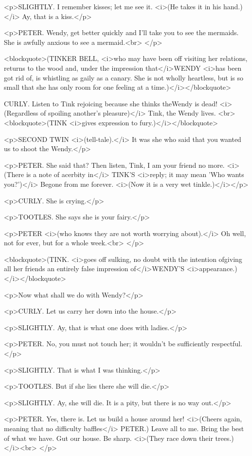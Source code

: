 <p>SLIGHTLY. I remember kisses; let me see it. <i>(He takes it in his
hand.)</i> Ay, that is a kiss.</p>

<p>PETER. Wendy, get better quickly and I'll take you to see the
mermaids. She is awfully anxious to see a mermaid.<br>
</p>

<blockquote>(TINKER BELL, <i>who may have been off visiting her
relations, returns to the wood and, under the impression
that</i>WENDY <i>has been got rid of, is whistling as gaily as a
canary. She is not wholly heartless, but is so small that she has
only room for one feeling at a time.)</i></blockquote>

CURLY. Listen to Tink rejoicing because she thinks theWendy is dead!
<i>(Regardless of spoiling another's pleasure)</i> Tink, the Wendy
lives. <br>
<blockquote>(TINK <i>gives expression to fury.)</i></blockquote>

<p>SECOND TWIN <i>(tell-tale).</i> It was she who said that you
wanted us to shoot the Wendy.</p>

<p>PETER. She said that? Then listen, Tink, I am your friend no more.
<i>(There is a note of acerbity in</i> TINK'S <i>reply; it may mean
'Who wants you?')</i> Begone from me forever. <i>(Now it is a very
wet tinkle.)</i></p>

<p>CURLY. She is crying.</p>

<p>TOOTLES. She says she is your fairy.</p>

<p>PETER <i>(who knows they are not worth worrying about).</i> Oh
well, not for ever, but for a whole week.<br>
</p>

<blockquote>(TINK. <i>goes off sulking, no doubt with the intention
ofgiving all her friends an entirely false impression of</i>WENDY'S
<i>appearance.)</i></blockquote>

<p>Now what shall we do with Wendy?</p>

<p>CURLY. Let us carry her down into the house.</p>

<p>SLIGHTLY. Ay, that is what one does with ladies.</p>

<p>PETER. No, you must not touch her; it wouldn't be sufficiently
respectful.</p>

<p>SLIGHTLY. That is what I was thinking.</p>

<p>TOOTLES. But if she lies there she will die.</p>

<p>SLIGHTLY. Ay, she will die. It is a pity, but there is no way
out.</p>

<p>PETER. Yes, there is. Let us build a house around her! <i>(Cheers
again, meaning that no difficulty baffles</i> PETER.) Leave all to
me. Bring the best of what we have. Gut our house. Be sharp. <i>(They
race down their trees.)</i><br>
</p>

